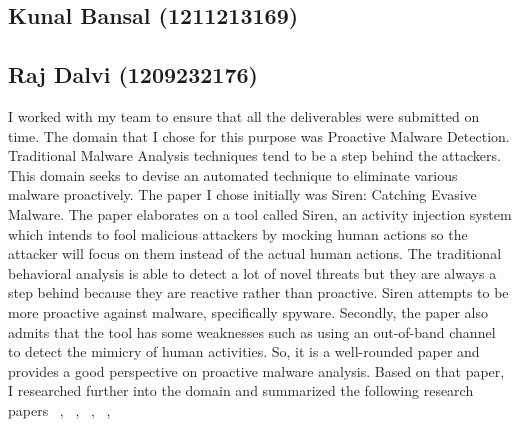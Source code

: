\documentclass[11pt]{article}
\begin{document}
\subsection{Kunal Bansal (1211213169)}



\subsection{Raj Dalvi (1209232176)}
I worked with my team to ensure that all the deliverables were submitted on time. The domain that I chose for this purpose was Proactive Malware Detection. Traditional Malware Analysis techniques tend to be a step behind the attackers. This domain seeks to devise an automated technique to eliminate various malware proactively. The paper I chose initially was Siren: Catching Evasive Malware. The paper elaborates on a tool called Siren, an activity injection system which intends to fool malicious attackers
by mocking human actions so the attacker will focus on them instead of the actual human actions. The traditional behavioral analysis is able to detect a lot of novel threats but they are always a step behind because they are reactive rather than proactive. Siren attempts to be more proactive against malware, specifically spyware. Secondly, the paper also admits that the tool has some weaknesses such as using an out-of-band channel to detect the mimicry of human activities. So, it is a well-rounded paper and provides a good perspective on proactive malware analysis. Based on that paper, I researched further into the domain and summarized the following research papers ~\cite{cyberthreatanalysis}, ~\cite{hookscout}, ~\cite{behaviorbasedproactive}, ~\cite{softcomputingproactive}, ~\cite{nidsproactive}
	
\end{document}
